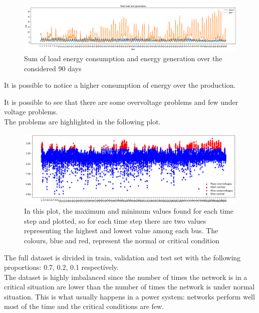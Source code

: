 \begin{figure}[H]
\centering
    \includegraphics[width=.9\linewidth]{images/MVOberr/Load&Gens.png}
\caption{Sum of load energy consumption and energy generation over the considered 90 days}
\label{fig:gym_anm_net}
\end{figure}

It is possible to notice a higher consumption of energy over the production.


It is possible to see that there are some overvoltage problems and few under voltage problems. \\
The problems are highlighted in the following plot.

\begin{figure}[H]
\centering
    \includegraphics[width=.8\linewidth]{images/MVOberr/CriticalSituation.png}
\caption{In this plot, the maximum and minimum values found for each time step and plotted, so for each time step there are two values representing the highest and lowest value among each bus. The colours, blue and red, represent the normal or critical condition}

 \end{figure}

The full dataset is divided in train, validation and test set with the following proportions: 0.7, 0.2, 0.1 respectively. \\

The dataset is highly imbalanced since the number of times the network is in a critical situation are lower than the number of times the network is under normal situation. This is what usually happens in a power system: networks perform well most of the time and the critical conditions are few.

